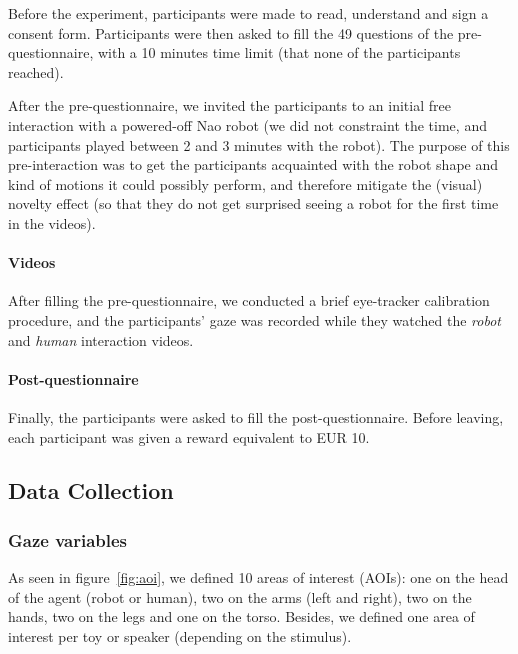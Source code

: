 \documentclass[lettersize, noapacite, twoside, HRI]{apa_HRI}
\begin{document}
Before the experiment, participants were made to read, understand and sign a
consent form. Participants were then asked to fill the 49 questions of
the pre-questionnaire, with a 10 minutes time limit (that none of the participants
reached).

After the pre-questionnaire, we invited the participants to an initial
free interaction with a powered-off Nao robot (we did not constraint
the time, and participants played between 2 and 3 minutes with the robot).
The purpose of this pre-interaction was to get the participants acquainted with the
robot shape and kind of motions it could possibly perform, and therefore
mitigate the (visual) novelty effect (so that they do not get surprised seeing
a robot for the first time in the videos).

\paragraph{Videos}

After filling the pre-questionnaire, we conducted a brief eye-tracker
calibration procedure, and the participants' gaze was recorded while they
watched the \emph{robot} and \emph{human} interaction videos.

\paragraph{Post-questionnaire}

Finally, the participants were asked to fill the post-questionnaire.
Before leaving, each participant was given a reward
equivalent to EUR 10.

\subsection{Data Collection}

\subsubsection{Gaze variables}

As seen in figure~\ref{fig:aoi}, we defined 10 areas of interest (AOIs): one on
the head of the agent (robot or human), two on the arms (left and right), two on
the hands, two on the legs and one on the torso. Besides, we defined one area of
interest per toy or speaker (depending on the stimulus).
\end{document}

